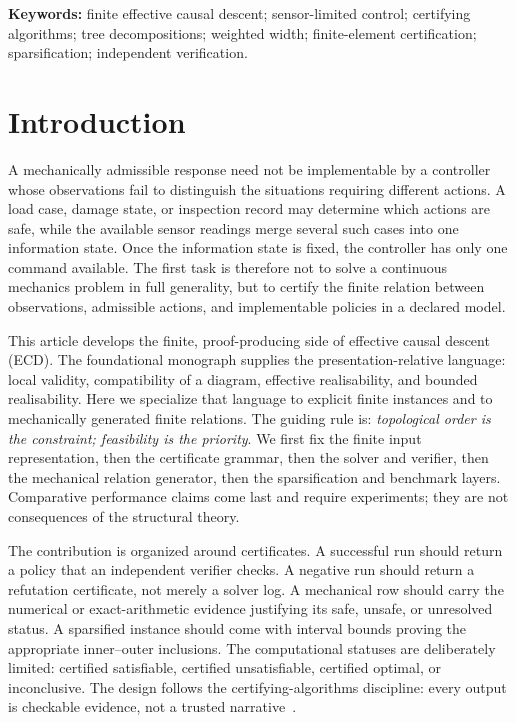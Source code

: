 \documentclass[11pt]{article}
\theoremstyle{plain}
\theoremstyle{definition}
\theoremstyle{remark}
\begin{document}
\noindent\textbf{Keywords:} finite effective causal descent; sensor-limited control;
certifying algorithms; tree decompositions; weighted width; finite-element
certification; sparsification; independent verification.

\tableofcontents

\section{Introduction}
\label{sec:introduction}

A mechanically admissible response need not be implementable by a controller
whose observations fail to distinguish the situations requiring different
actions.  A load case, damage state, or inspection record may determine which
actions are safe, while the available sensor readings merge several such cases
into one information state.  Once the information state is fixed, the controller
has only one command available.  The first task is therefore not to solve a
continuous mechanics problem in full generality, but to certify the finite
relation between observations, admissible actions, and implementable policies in
a declared model.

This article develops the finite, proof-producing side of effective causal
descent (ECD).  The foundational monograph supplies the presentation-relative
language: local validity, compatibility of a diagram, effective realisability,
and bounded realisability.  Here we specialize that language to explicit finite
instances and to mechanically generated finite relations.  The guiding rule is:
\emph{topological order is the constraint; feasibility is the priority}.  We
first fix the finite input representation, then the certificate grammar, then
the solver and verifier, then the mechanical relation generator, then the
sparsification and benchmark layers.  Comparative performance claims come last
and require experiments; they are not consequences of the structural theory.

The contribution is organized around certificates.  A successful run should
return a policy that an independent verifier checks.  A negative run should
return a refutation certificate, not merely a solver log.  A mechanical row
should carry the numerical or exact-arithmetic evidence justifying its safe,
unsafe, or unresolved status.  A sparsified instance should come with interval
bounds proving the appropriate inner--outer inclusions.  The computational
statuses are deliberately limited: certified satisfiable, certified
unsatisfiable, certified optimal, or inconclusive.  The design follows the
certifying-algorithms discipline: every output is checkable evidence, not a
trusted narrative~\cite{mcm11}.
\end{document}

